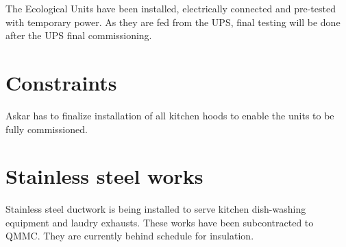 The Ecological Units have been installed,  electrically connected and pre-tested with temporary power. As they are fed from the UPS, final testing will be done after the UPS final commissioning.  

\section{Constraints}

Askar has to finalize installation of all kitchen hoods to enable the units to be fully commissioned.

\newenvironment{activitytable}{
\begin{longtable}{@{} c  l  l  l l  l l  p{3cm} }
\toprule
Floor/Activity &\textcircled{1}&\textcircled{2}
                   &\textcircled{3}&\textcircled{4}
                   &\textcircled{5}&\textcircled{\color{black}{6}}&Remarks\\
\midrule}{%
\bottomrule
\end{longtable}}

\section{Stainless steel works}

Stainless steel ductwork is being installed to serve kitchen dish-washing equipment and laudry exhausts. 
These works have been subcontracted to QMMC. They are currently behind schedule for insulation. 


